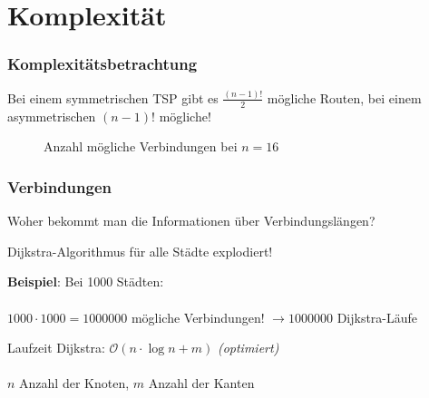 \documentclass[handout]{beamer}
\begin{document}
  \section{Komplexität}
  \begin{frame}
    \frametitle{Komplexitätsbetrachtung}
    Bei einem symmetrischen TSP gibt es $\frac{(n-1)!}{2}$ mögliche Routen,
    bei einem asymmetrischen $(n-1)!$ mögliche!

    \newcount\mycount

    \begin{figure}
      \centering
      \caption{Anzahl mögliche Verbindungen bei $n=16$}
    \end{figure}
  \end{frame}

  \begin{frame}
    \frametitle{Verbindungen}

    Woher bekommt man die Informationen über Verbindungslängen?
    \pause
    \vspace{2em}

    Dijkstra-Algorithmus für alle Städte explodiert!

    \pause
    \vspace{1em}

    \textbf{Beispiel}: Bei 1000 Städten: \\~\\
    $1000 \cdot 1000 = 1 000 000$ mögliche Verbindungen!
    $\rightarrow 1 000 000$ Dijkstra-Läufe

    \vspace{1em}
    Laufzeit Dijkstra: $\mathcal O(n \cdot \log n + m)$ \textit{(optimiert)}
    \\~\\
    $n$ Anzahl der Knoten, $m$ Anzahl der Kanten
  \end{frame}
\end{document}
